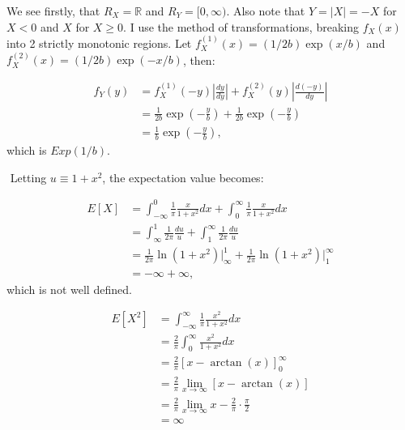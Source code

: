 \begin{problem}{18} We see firstly, that $R_X = \mathbb R$ and $R_Y = [0, \infty)$.  Also note that $Y = |X| = -X$ for $X<0$ and $X$ for $X\ge 0$. I use the method of transformations, breaking $f_X(x)$ into 2 strictly monotonic regions.  Let $f_X^{(1)}(x) = (1/2b)\exp{(x/b)}$ and $f_X^{(2)}(x) = (1/2b)\exp{(-x/b)}$, then:

\begin{align*}
f_Y(y) &= f_X^{(1)}(-y)\left | \frac{dy}{dy} \right|+ f_X^{(2)}(y)\left | \frac{d(-y)}{dy} \right|\\
& = \frac{1}{2b}\exp{\left(-\frac{y}{b} \right)}+\frac{1}{2b}\exp{\left(-\frac{y}{b} \right)} \\
& = \frac{1}{b}\exp{\left(-\frac{y}{b} \right)},
\end{align*}
which is $Exp(1/b)$.

\end{problem}

\begin{problem}{19}$ $
Letting $u \equiv 1+x^2$, the expectation value becomes:

\begin{align*}
E[X] &= \int_{-\infty}^0\frac{1}{\pi}\frac{x}{1+x^2}dx+\int_{0}^\infty \frac{1}{\pi}\frac{x}{1+x^2}dx \\
& = \int_\infty^1 \frac{1}{2 \pi} \frac{du}{u}+\int_1^\infty \frac{1}{2 \pi} \frac{du}{u} \\
& = \frac{1}{2\pi} \ln(1+x^2)\Big|_\infty^1+\frac{1}{2\pi} \ln(1+x^2)\Big|_1^\infty\\
& = -\infty +\infty, 
\end{align*}
which is not well defined.


\begin{align*}
E[X^2]& = \int_{-\infty}^\infty\frac{1}{\pi}\frac{x^2}{1+x^2}dx \\
& =  \frac{2}{\pi}\int_{0}^\infty \frac{x^2}{1+x^2}dx \\
& = \frac{2}{\pi}\left [x -\arctan(x) \right]_0^\infty \\
& = \frac{2}{\pi} \lim_{x \rightarrow \infty}[x -\arctan(x) ] \\
& =\frac{2}{\pi} \lim_{x \rightarrow \infty}x -\frac{2}{\pi} \cdot \frac{\pi}{2} \\
& = \infty
\end{align*}

\end{problem}


